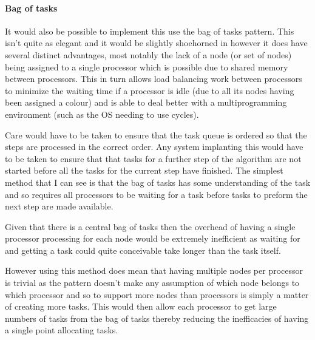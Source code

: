 \documentclass[11pt,a4paper]{article}
\begin{document}
\paragraph{Bag of tasks} It would also be possible to implement this use the bag of tasks
pattern. This isn't quite as elegant and it would be slightly shoehorned
in however it does have several distinct advantages, most notably
the lack of a node (or set of nodes) being assigned to a single processor
which is possible due to shared memory between processors. This in turn allows
load balancing work between processors to minimize the waiting time if a
processor is idle (due to all its nodes having been assigned a colour) and is able
to deal better with a multiprogramming environment (such as the OS needing to use cycles).

Care would have to be taken to ensure that the task queue is ordered so
that the steps are processed in the correct order. Any system implanting
this would have to be taken to ensure that that tasks for a further step of the algorithm are not
started before all the tasks for the current step have finished.  The simplest method that I can see is that the bag of tasks has some understanding of the task and so requires all processors to be waiting for a task before tasks to preform the next step are made available.

Given that there is a central bag of tasks then the overhead of having a single 
processor processing for each node would be extremely inefficient as waiting for 
and getting a task could quite conceivable take longer than the task itself.

However using this method does mean that having multiple nodes per processor is trivial as the pattern doesn't make any assumption of which node belongs to which processor and so to support more nodes than processors is simply a matter of creating more tasks. This would then allow each processor to get large numbers of tasks from the bag of tasks thereby reducing the inefficacies of having a single point allocating tasks.

%
\end{document}
